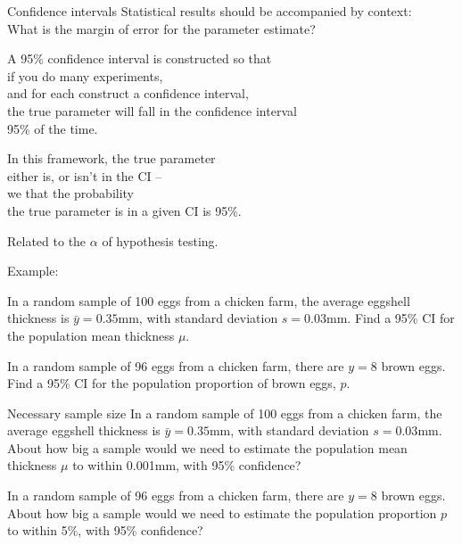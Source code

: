 \begin{frame}{Confidence intervals}
    Statistical results should be accompanied by \alert{context}:\\
    What is the margin of error for the parameter estimate?
    \pause

    \vspace{2em}

    A 95\% \alert{confidence interval} is constructed so that \\
    if you do many experiments,\\
    and for each construct a confidence interval,\\
    the true parameter will fall in the confidence interval \\
    95\% of the time.
    \pause

    \vspace{2em}

    In this framework, the true parameter \\
    \alert{either is, or isn't} in the CI -- \\
    we  that the probability \\
    the true parameter is in a \alert{given} CI is 95\%.
    \pause

    \vspace{2em}

     Related to the $\alpha$ of hypothesis testing.
\end{frame}

\begin{frame}{Example:}

    In a random sample of 100 eggs from a chicken farm,
    the average eggshell thickness is $\bar y= 0.35$mm,
    with standard deviation $s=0.03$mm.  
    Find a 95\% CI for the population mean thickness $\mu$.

    \vfill

    In a random sample of 96 eggs from a chicken farm,
    there are $y=8$ brown eggs.
    Find a 95\% CI for the population proportion of brown eggs, $p$.

    \vfill
    
\end{frame}

\begin{frame}{Necessary sample size}
    In a random sample of 100 eggs from a chicken farm,
    the average eggshell thickness is $\bar y= 0.35$mm,
    with standard deviation $s=0.03$mm.  
    About how big a sample would we need
    to estimate the population mean thickness $\mu$
    to within 0.001mm, with 95\% confidence?

    \vfill

    In a random sample of 96 eggs from a chicken farm,
    there are $y=8$ brown eggs.
    About how big a sample would we need
    to estimate the population proportion $p$
    to within 5\%, with 95\% confidence?

    \vfill
    
\end{frame}

